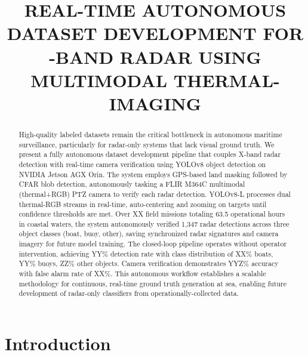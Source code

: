 \documentclass[conf]{asmeconf}
\title{REAL-TIME AUTONOMOUS DATASET DEVELOPMENT FOR \NoCaseChange{X}-BAND RADAR USING MULTIMODAL THERMAL-\NoCaseChange{RGB} IMAGING}
\begin{document}
\maketitle



\begin{abstract}
High-quality labeled datasets remain the critical bottleneck in autonomous maritime surveillance, particularly for radar-only systems that lack visual ground truth. We present a fully autonomous dataset development pipeline that couples X-band radar detection with real-time camera verification using YOLOv8 object detection on NVIDIA Jetson AGX Orin. The system employs GPS-based land masking followed by CFAR blob detection, autonomously tasking a FLIR M364C multimodal (thermal+RGB) PTZ camera to verify each radar detection. YOLOv8-L processes dual thermal-RGB streams in real-time, auto-centering and zooming on targets until confidence thresholds are met. Over XX field missions totaling 63.5 operational hours in coastal waters, the system autonomously verified 1,347 radar detections across three object classes (boat, buoy, other), saving synchronized radar signatures and camera imagery for future model training. The closed-loop pipeline operates without operator intervention, achieving YY\% detection rate with class distribution of XX\% boats, YY\% buoys, ZZ\% other objects. Camera verification demonstrates YYZ\% accuracy with false alarm rate of XX\%. This autonomous workflow establishes a scalable methodology for continuous, real-time ground truth generation at sea, enabling future development of radar-only classifiers from operationally-collected data.
\end{abstract}

\begin{nomenclature}
\end{nomenclature}

\section{Introduction}
\end{document}
